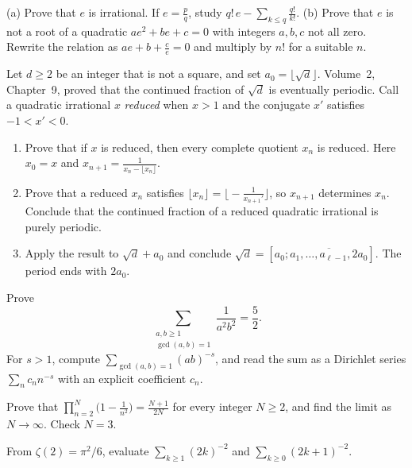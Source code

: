 \begin{exercise}[$\star\star$]\label{ex:eirrational}
(a) Prove that $e$ is irrational. If $e=\frac pq$, study $q!\,e-\sum_{k\le q}\frac{q!}{k!}$.
(b) Prove that $e$ is not a root of a quadratic $ae^2+be+c=0$ with integers $a,b,c$ not all zero. Rewrite the relation as $ae+b+\frac ce=0$ and multiply by $n!$ for a suitable $n$.
\end{exercise}

\begin{exercise}[$\star\star\star$]\label{ex:sqrtperiod}
Let $d\ge2$ be an integer that is not a square, and set $a_0=\lfloor\sqrt d\rfloor$. Volume~2, Chapter~9, proved that the continued fraction of $\sqrt d$ is eventually periodic. Call a quadratic irrational $x$ \emph{reduced} when $x>1$ and the conjugate $x'$ satisfies $-1<x'<0$.
\begin{enumerate}[label=(\alph*)]
\item Prove that if $x$ is reduced, then every complete quotient $x_n$ is reduced. Here $x_0=x$ and $x_{n+1}=\frac1{x_n-\lfloor x_n\rfloor}$.
\item Prove that a reduced $x_n$ satisfies $\lfloor x_n\rfloor=\bigl\lfloor-\frac1{x_{n+1}'}\bigr\rfloor$, so $x_{n+1}$ determines $x_n$. Conclude that the continued fraction of a reduced quadratic irrational is purely periodic.
\item Apply the result to $\sqrt d+a_0$ and conclude $\sqrt d=[a_0;\overline{a_1,\dots,a_{\ell-1},2a_0}]$. The period ends with $2a_0$.
\end{enumerate}
\end{exercise}

\begin{exercise}[$\star\star$]\label{pb:coprime52}
Prove
\[
\sum_{\substack{a,b\ge1\\\gcd(a,b)=1}}\frac1{a^2b^2}=\frac52.
\]
For $s>1$, compute $\sum_{\gcd(a,b)=1}(ab)^{-s}$, and read the sum as a Dirichlet series $\sum_nc_nn^{-s}$ with an explicit coefficient $c_n$.
\end{exercise}

\begin{exercise}[$\star$]\label{ex:rw03a}
Prove that $\prod_{n=2}^{N}\bigl(1-\frac1{n^2}\bigr)=\frac{N+1}{2N}$ for every integer $N\ge2$, and find the limit as $N\to\infty$. Check $N=3$.
\end{exercise}

\begin{exercise}[$\star\star$]\label{ex:rw03b}
From $\zeta(2)=\pi^2/6$, evaluate $\sum_{k\ge1}(2k)^{-2}$ and $\sum_{k\ge0}(2k+1)^{-2}$.
\end{exercise}

